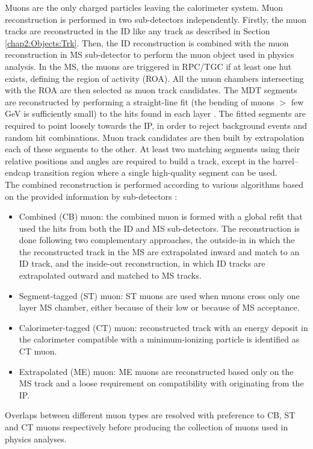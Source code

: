 Muons are the only charged particles leaving the calorimeter system. Muon reconstruction is performed in two sub-detectors independently. Firstly, the muon tracks are reconstructed in the ID like any track as described in Section \ref{chap2:Objects:Trk}. Then, the ID reconstruction is combined with the muon reconstruction in MS sub-detector to perform the muon object used in physics analysis. In the MS, the muons are triggered in RPC/TGC if at least one hut exists, defining the region of activity (ROA). All the muon chambers intersecting with the ROA are then selected as muon track candidates. The MDT segments are reconstructed by performing a straight-line fit (the bending of muons $>$ few GeV is sufficiently small) to the hits found in each layer \cite{hough}. The fitted segments are required to point loosely towards the IP, in order to reject background events and random hit combinations. Muon track candidates are then built by extrapolation each of these segments to the other. At least two matching segments  using their relative positions and angles are required to build a track, except in the barrel–endcap transition region where a single high-quality segment can be used. \\
The combined reconstruction is performed according to various algorithms based on the provided information by sub-detectors \cite{Muon_Reco_2014_algo,Muon_Reco_2016_algo}: 
\begin{itemize}
    \item Combined (CB) muon: the combined muon is formed with a global refit that used the hits from both the ID and MS sub-detectors. The reconstruction is done following two complementary approaches, the outside-in in which the the reconstructed track in the MS are extrapolated inward and match to an ID track, and the inside-out reconstruction, in which ID tracks are extrapolated outward and matched to MS tracks. 
    \item Segment-tagged (ST) muon: ST muons are used when muons cross only one layer MS chamber, either because of their low \pT or because of MS acceptance. 
    \item Calorimeter-tagged (CT) muon: reconstructed track with an energy deposit in the calorimeter compatible with a minimum-ionizing particle is identified as CT muon. 
    \item Extrapolated (ME) muon: ME muons are reconstructed based only on the MS track and a loose requirement on compatibility with originating from the IP. 
\end{itemize}
Overlaps between different muon types are resolved with preference to CB, ST and CT muons respectively before producing the collection of muons used in physics analyses.

